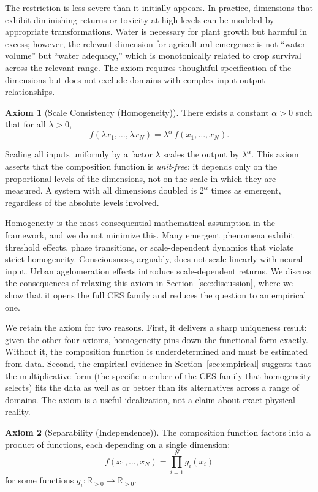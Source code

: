 \documentclass[12pt, a4paper]{article}
\theoremstyle{definition}
\newtheorem{axiom}{Axiom}
\theoremstyle{remark}
\newcommand{\Rp}{\mathbb{R}_{>0}}
\begin{document}
The restriction is less severe than it initially appears. In practice, dimensions that exhibit diminishing returns or toxicity at high levels can be modeled by appropriate transformations. Water is necessary for plant growth but harmful in excess; however, the relevant dimension for agricultural emergence is not ``water volume'' but ``water adequacy,'' which is monotonically related to crop survival across the relevant range. The axiom requires thoughtful specification of the dimensions but does not exclude domains with complex input-output relationships.

\begin{axiom}[Scale Consistency (Homogeneity)]\label{ax:scale}
There exists a constant $\alpha > 0$ such that for all $\lambda > 0$,
\[
f(\lambda x_1, \ldots, \lambda x_N) = \lambda^\alpha \, f(x_1, \ldots, x_N).
\]
\end{axiom}

\noindent Scaling all inputs uniformly by a factor $\lambda$ scales the output by $\lambda^\alpha$. This axiom asserts that the composition function is \textit{unit-free}: it depends only on the proportional levels of the dimensions, not on the scale in which they are measured. A system with all dimensions doubled is $2^\alpha$ times as emergent, regardless of the absolute levels involved.

Homogeneity is the most consequential mathematical assumption in the framework, and we do not minimize this. Many emergent phenomena exhibit threshold effects, phase transitions, or scale-dependent dynamics that violate strict homogeneity. Consciousness, arguably, does not scale linearly with neural input. Urban agglomeration effects introduce scale-dependent returns. We discuss the consequences of relaxing this axiom in Section~\ref{sec:discussion}, where we show that it opens the full CES family and reduces the question to an empirical one.

We retain the axiom for two reasons. First, it delivers a sharp uniqueness result: given the other four axioms, homogeneity pins down the functional form exactly. Without it, the composition function is underdetermined and must be estimated from data. Second, the empirical evidence in Section~\ref{sec:empirical} suggests that the multiplicative form (the specific member of the CES family that homogeneity selects) fits the data as well as or better than its alternatives across a range of domains. The axiom is a useful idealization, not a claim about exact physical reality.

\begin{axiom}[Separability (Independence)]\label{ax:sep}
The composition function factors into a product of functions, each depending on a single dimension:
\[
f(x_1, \ldots, x_N) = \prod_{i=1}^{N} g_i(x_i)
\]
for some functions $g_i : \Rp \to \Rp$.
\end{axiom}
\end{document}
